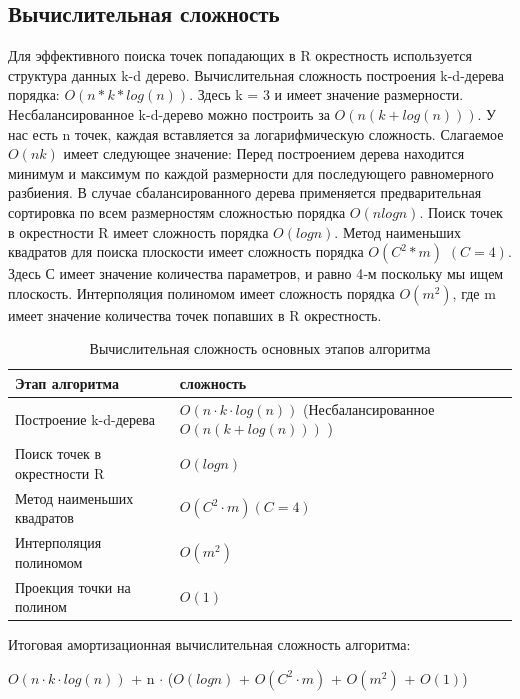 \clearpage



\subsection{Вычислительная сложность}
Для эффективного поиска точек попадающих в R окрестность используется структура данных k-d дерево. Вычислительная сложность построения k-d-дерева порядка: $O(n*k*log(n))$. Здесь k = 3 и имеет значение размерности. Несбалансированное k-d-дерево можно построить за $O(n(k+log(n)))$. У нас есть n точек, каждая вставляется за логарифмическую сложность. Слагаемое $O(nk)$ имеет следующее значение: Перед построением дерева находится минимум и максимум по каждой размерности для последующего равномерного разбиения. В случае сбалансированного дерева применяется предварительная сортировка по всем размерностям сложностью порядка $O(nlog n)$.
Поиск точек в окрестности R имеет сложность порядка $O(log n)$.
Метод наименьших квадратов для поиска плоскости имеет сложность порядка $O(C^2*m)$ $ (C = 4)$. Здесь С имеет значение количества параметров, и равно 4‑м поскольку мы ищем плоскость.
Интерполяция полиномом имеет сложность порядка $O(m^2)$, где m имеет значение количества точек попавших в R окрестность.

\begin{table}[h]
\centering
\begin{tabular}{||p{7cm}||p{9.3cm}||}
\hline
Этап алгоритма & сложность\\
\hline\hline
Построение k-d-дерева &  $O(n \cdot k \cdot log(n))$ (Несбалансированное $O(n(k+log(n)))$ ) \\
\hline
Поиск точек в окрестности R & $O(log n)$  \\
\hline
Метод наименьших квадратов & $O(C^2 \cdot m) (C = 4)$\\
\hline
Интерполяция полиномом & $O(m^2)$ \\
\hline
Проекция точки на полином & $O(1)$ \\
\hline
\end{tabular}
\caption{Вычислительная сложность основных этапов алгоритма}
\label{table:complexity}
\end{table}

Итоговая амортизационная вычислительная сложность алгоритма: 

$O(n \cdot k \cdot log(n))$  + n $\cdot$ ($O(log n)$ + $O(C^2 \cdot m)$ + $O(m^2)$ + $O(1)$)